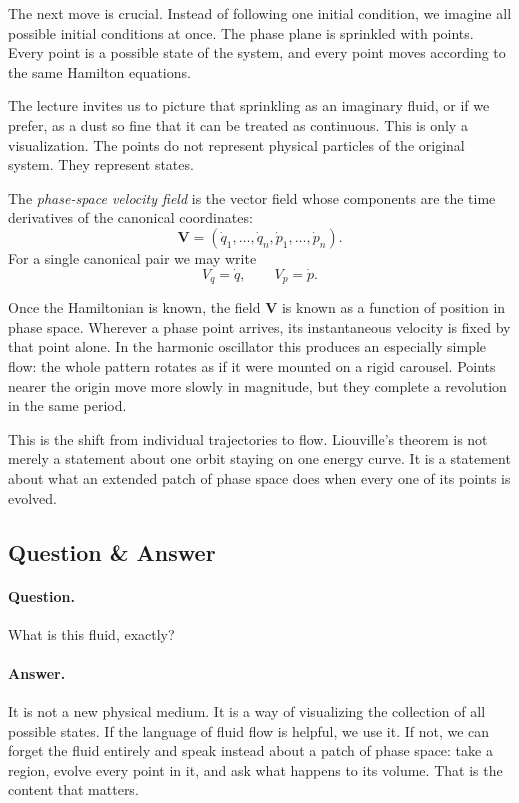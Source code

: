 The next move is crucial. Instead of following one initial condition, we imagine all possible initial conditions at once. The phase plane is sprinkled with points. Every point is a possible state of the system, and every point moves according to the same Hamilton equations.

The lecture invites us to picture that sprinkling as an imaginary fluid, or if we prefer, as a dust so fine that it can be treated as continuous. This is only a visualization. The points do not represent physical particles of the original system. They represent states.

\begin{definition}
The \emph{phase-space velocity field} is the vector field whose components are the time derivatives of the canonical coordinates:
\begin{equation}
\mathbf V
=
(\dot q_1,\dots,\dot q_n,\dot p_1,\dots,\dot p_n).
\end{equation}
For a single canonical pair we may write
\begin{equation}
V_q=\dot q, \qquad V_p=\dot p.
\end{equation}
\end{definition}

Once the Hamiltonian is known, the field \(\mathbf V\) is known as a function of position in phase space. Wherever a phase point arrives, its instantaneous velocity is fixed by that point alone. In the harmonic oscillator this produces an especially simple flow: the whole pattern rotates as if it were mounted on a rigid carousel. Points nearer the origin move more slowly in magnitude, but they complete a revolution in the same period.

This is the shift from individual trajectories to flow. Liouville's theorem is not merely a statement about one orbit staying on one energy curve. It is a statement about what an extended patch of phase space does when every one of its points is evolved.

\subsection{Question \& Answer}

\paragraph{Question.} What is this fluid, exactly?

\paragraph{Answer.} It is not a new physical medium. It is a way of visualizing the collection of all possible states. If the language of fluid flow is helpful, we use it. If not, we can forget the fluid entirely and speak instead about a patch of phase space: take a region, evolve every point in it, and ask what happens to its volume. That is the content that matters.

